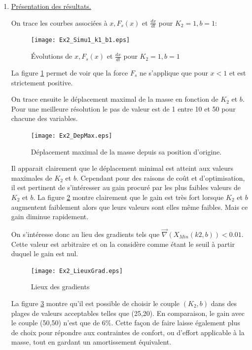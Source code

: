 \documentclass[a4paper,12pt,fleqn]{article}
\newcommand{\X}{x}
\newcommand{\dX}{\frac{d\X}{dt}}
\newcommand{\Fs}{F_s}
\begin{document}
\begin{enumerate}
\FloatBarrier
 \pagebreak[4]
 
\item \underline{Présentation des résultats.}

On trace les courbes associées à $\X, \Fs(\X)$ et $\dX$ pour $K_2=1, b=1$:

\begin{figure}
  \centering      
    \texttt{[image: Ex2\_Simu1\_k1\_b1.eps]}
	\caption{Évolutions de $\X, \Fs(\X)$ et $\dX$ pour $K_2=1, b=1$}
	\label{Ex:Resultats:1}
\end{figure}

La figure \ref{Ex:Resultats:1} permet de voir que la force $F_s$ ne s'applique que pour $x<1$ et est strictement positive.

On trace ensuite le déplacement maximal de la masse en fonction de $K_2$ et $b$. Pour une meilleure résolution le pas de valeur est de 1 entre 10 et 50 pour chacune des variables.

\begin{figure}
  \centering      
    \texttt{[image: Ex2\_DepMax.eps]}
	\caption{Déplacement maximal de la masse depuis sa position d'origine.}
	\label{Ex:Resultats:2}
\end{figure}

Il apparait clairement que le déplacement minimal est atteint aux valeurs maximales de $K_2$ et $b$.
Cependant pour des raisons de coût et d'optimisation, il est pertinent de s'intéresser au gain procuré par les plus faibles valeurs de $K_2$ et $b$. 
La figure \ref{Ex:Resultats:2} montre clairement que le gain est très fort lorsque $K_2$ et $b$ augmentent faiblement alors que leurs valeurs sont elles même faibles. Mais ce gain diminue rapidement.

On s'intéresse donc au lieu des gradients tels que $\vec\nabla(X_{Min}(k2,b)) < 0.01$. Cette valeur est arbitraire et on la considère comme étant le seuil à partir duquel le gain est nul.

\begin{figure}
  \centering      
    \texttt{[image: Ex2\_LieuxGrad.eps]}
	\caption{Lieux des gradients}
	\label{Ex:Resultats:3}
\end{figure}

\FloatBarrier

La figure \ref{Ex:Resultats:3} montre qu'il est possible de choisir le couple $(K_2,b)$ dans des plages de valeurs acceptables telles que (25,20).
En comparaison, le gain avec le couple (50,50) n'est que de $6\%$.
Cette façon de faire laisse également plus de choix pour répondre aux contraintes de confort, ou d'effort applicable à la masse, tout en gardant un amortissement équivalent.

\end{enumerate}
\end{document}
